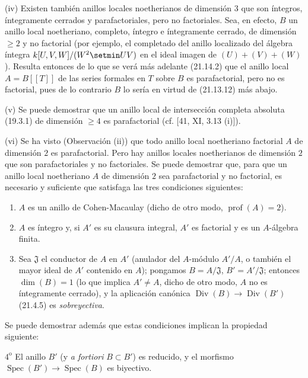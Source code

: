 \begin{env}[21.13.9]
(iv) Existen también anillos locales noetherianos de dimensión $3$ que son
íntegros, íntegramente cerrados y parafactoriales, pero no factoriales. Sea, en efecto, $B$
un anillo local noetheriano, completo, íntegro e íntegramente cerrado, de dimensión
$\geq2$ y no factorial (por ejemplo, el completado del anillo localizado del álgebra
íntegra $k[U,V,W]/(W^2\setmin UV)$ en el ideal imagen de $(U)+(V)+(W)$). Resulta entonces de
lo que se verá más adelante (21.14.2) que el anillo local $A=B[[T]]$ de las series formales
en $T$ sobre $B$ es parafactorial, pero no es factorial, pues de lo contrario $B$ lo sería
en virtud de (21.13.12) más abajo.

(v) Se puede demostrar que un anillo local de intersección completa absoluta (19.3.1) de
dimensión $\geq4$ es parafactorial (cf. [41, XI, 3.13 (i)]).

(vi) Se ha visto (Observación (ii)) que todo anillo local noetheriano factorial $A$ de
dimensión $2$ es parafactorial. Pero hay anillos locales noetherianos de
dimensión $2$ que son parafactoriales y no factoriales. Se puede demostrar que, para
que un anillo local noetheriano $A$ de dimensión $2$ sea parafactorial y no
factorial, es necesario y suficiente que satisfaga las tres condiciones siguientes:
\begin{enumerate}[label=\arabic*\textsuperscript{o}]
  \item $A$ es un anillo de Cohen-Macaulay (dicho de otro modo,
  $\operatorname{prof}(A)=2$).
  \item $A$ es íntegro y, si $A'$ es su clausura integral, $A'$ es factorial y es
  un $A$-álgebra finita.
  \item Sea $\mathfrak J$ el conductor de $A$ en $A'$ (anulador del $A$-módulo
  $A'/A$, o también el mayor ideal de $A'$ contenido en $A$); pongamos
  $B=A/\mathfrak J$, $B'=A'/\mathfrak J$; entonces $\dim(B)=1$ (lo que implica
  $A'\neq A$, dicho de otro modo, $A$ no es íntegramente cerrado), y la aplicación
  canónica $\operatorname{Div}(B)\to\operatorname{Div}(B')$ (21.4.5) es
  \emph{sobreyectiva}.
\end{enumerate}
Se puede demostrar además que estas condiciones implican la propiedad siguiente:

$4^{\mathrm o}$ El anillo $B'$ (y \emph{a fortiori} $B\subset B'$) es reducido, y el
morfismo $\operatorname{Spec}(B')\to\operatorname{Spec}(B)$ es biyectivo.


\end{env}
